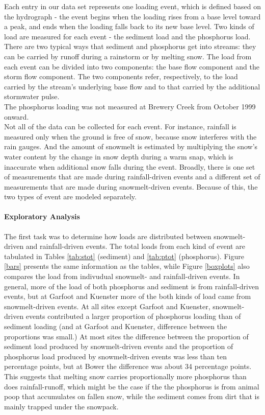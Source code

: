\documentclass[10pt]{article}
\begin{document}
Each entry in our data set represents one loading event, which is defined based on the hydrograph - the event begins when the loading rises from a base level toward a peak, and ends when the loading falls back to its new base level. Two kinds of load are measured for each event - the sediment load and the phosphorus load. There are two typical ways that sediment and phosphorus get into streams: they can be carried by runoff during a rainstorm or by melting snow. The load from each event can be divided into two components: the base flow component and the storm flow component. The two components refer, respectively, to the load carried by the stream's underlying base flow and to that carried by the additional stormwater pulse.\\

The phosphorus loading was not measured at Brewery Creek from October 1999 onward.\\

Not all of the data can be collected for each event. For instance, rainfall is measured only when the ground is free of snow, because snow interferes with the rain gauges. And the amount of snowmelt is estimated by multiplying the snow's water content by the change in snow depth during a warm snap, which is inaccurate when additional snow falls during the event. Broadly, there is one set of measurements that are made during rainfall-driven events and a different set of measurements that are made during snowmelt-driven events. Because of this, the two types of event are modeled separately.\\


\paragraph{Exploratory Analysis}
The first task was to determine how loads are distributed between snowmelt-driven and rainfall-driven events. The total loads from each kind of event are tabulated in Tables \ref{tab:stot} (sediment) and \ref{tab:ptot} (phosphorus). Figure \ref{bars} presents the same information as the tables, while Figure \ref{boxplots} also compares the load from indivudual snowmelt- and rainfall-driven events. In general, more of the load of both phosphorus and sediment is from rainfall-driven events, but at Garfoot and Kuenster more of the both kinds of load came from snowmelt-driven events. At all sites except Garfoot and Kuenster, snowmelt-driven events contributed a larger proportion of phosphorus loading than of sediment loading (and at Garfoot and Kuenster, difference between the proportions was small.) At most sites the difference between the proportion of sediment load produced by snowmelt-driven events and the proportion of phosphorus load produced by snowmelt-driven events was less than ten percentage points, but at Bower the difference was about 34 percentage points. This suggests that melting snow carries proportionally more phosphorus than does rainfall-runoff, which might be the case if the the phosphorus is from animal poop that accumulates on fallen snow, while the sediment comes from dirt that is mainly trapped under the snowpack.\\
\end{document}
